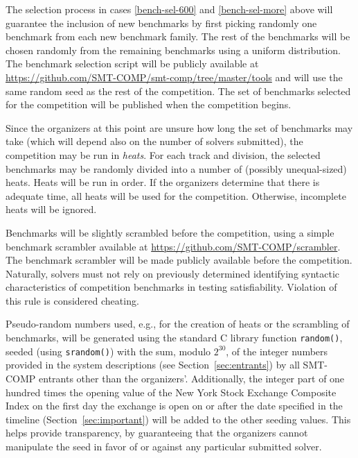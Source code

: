 \documentclass[12pt]{article}
\begin{document}
%
The selection process in cases \ref{bench-sel-600} and \ref{bench-sel-more}
above will guarantee the inclusion of new benchmarks by first picking randomly
one benchmark from each new benchmark family.  The rest of the benchmarks will
be chosen randomly from the remaining benchmarks using a uniform distribution.
%
The benchmark selection script will be publicly available at
\url{https://github.com/SMT-COMP/smt-comp/tree/master/tools} and
will use the same random seed as the rest of the competition.  The set of
benchmarks selected for the competition will be published when the competition
begins.

%
Since the organizers at this point are unsure how long the set of
benchmarks may take (which will depend also on the number of solvers
submitted), the competition may be run in \emph{heats}.  For each
track and division, the selected benchmarks may be randomly divided
into a number of (possibly unequal-sized) heats.  Heats will be run in
order.  If the organizers determine that there is adequate time, all
heats will be used for the competition.  Otherwise, incomplete heats
will be ignored.

%
Benchmarks will be slightly scrambled before the competition, using a simple
benchmark scrambler available at \url{https://github.com/SMT-COMP/scrambler}.
The benchmark scrambler will be made publicly available before the competition.
%
Naturally, solvers must not rely on previously determined identifying
syntactic characteristics of competition benchmarks in testing
satisfiability.  Violation of this rule is considered cheating.

%
Pseudo-random numbers used, e.g., for the creation of heats or the
scrambling of benchmarks, will be generated using the standard C
library function \texttt{random()}, seeded (using \texttt{srandom()})
with the sum, modulo $2^{30}$, of the integer numbers provided in the
system descriptions (see Section~\ref{sec:entrants}) by all SMT-COMP
entrants other than the organizers'.  Additionally, the integer part
of one hundred times the opening value of the New York Stock Exchange
Composite Index on
the first day the exchange is open on or after the date specified in
the timeline (Section~\ref{sec:important}) will be added to the other
seeding values. This helps provide transparency, by guaranteeing that
the organizers cannot manipulate the seed in favor of or against any
particular submitted solver.

\end{document}
